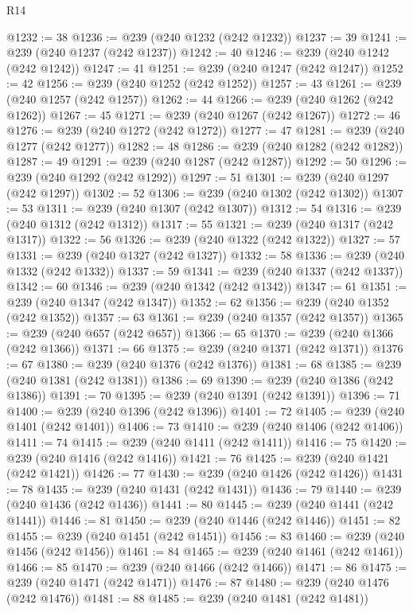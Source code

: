 \begin{lexlean}{R14}
\begin{coremodule}
{{{{{{{{{{{{{{{{{{{{{{{{{{{{{{{{{{{{{{{{{{{{{{{{{{{{{{{{{{{{{{{{{{{{{{{{{{{{{{{{{{{{{{{{{{{{{{{{{{{{{{{{{{@1232 := 38
@1236 := @239 (@240 @1232 (@242 @1232))
@1237 := 39
@1241 := @239 (@240 @1237 (@242 @1237))
@1242 := 40
@1246 := @239 (@240 @1242 (@242 @1242))
@1247 := 41
@1251 := @239 (@240 @1247 (@242 @1247))
@1252 := 42
@1256 := @239 (@240 @1252 (@242 @1252))
@1257 := 43
@1261 := @239 (@240 @1257 (@242 @1257))
@1262 := 44
@1266 := @239 (@240 @1262 (@242 @1262))
@1267 := 45
@1271 := @239 (@240 @1267 (@242 @1267))
@1272 := 46
@1276 := @239 (@240 @1272 (@242 @1272))
@1277 := 47
@1281 := @239 (@240 @1277 (@242 @1277))
@1282 := 48
@1286 := @239 (@240 @1282 (@242 @1282))
@1287 := 49
@1291 := @239 (@240 @1287 (@242 @1287))
@1292 := 50
@1296 := @239 (@240 @1292 (@242 @1292))
@1297 := 51
@1301 := @239 (@240 @1297 (@242 @1297))
@1302 := 52
@1306 := @239 (@240 @1302 (@242 @1302))
@1307 := 53
@1311 := @239 (@240 @1307 (@242 @1307))
@1312 := 54
@1316 := @239 (@240 @1312 (@242 @1312))
@1317 := 55
@1321 := @239 (@240 @1317 (@242 @1317))
@1322 := 56
@1326 := @239 (@240 @1322 (@242 @1322))
@1327 := 57
@1331 := @239 (@240 @1327 (@242 @1327))
@1332 := 58
@1336 := @239 (@240 @1332 (@242 @1332))
@1337 := 59
@1341 := @239 (@240 @1337 (@242 @1337))
@1342 := 60
@1346 := @239 (@240 @1342 (@242 @1342))
@1347 := 61
@1351 := @239 (@240 @1347 (@242 @1347))
@1352 := 62
@1356 := @239 (@240 @1352 (@242 @1352))
@1357 := 63
@1361 := @239 (@240 @1357 (@242 @1357))
@1365 := @239 (@240 @657 (@242 @657))
@1366 := 65
@1370 := @239 (@240 @1366 (@242 @1366))
@1371 := 66
@1375 := @239 (@240 @1371 (@242 @1371))
@1376 := 67
@1380 := @239 (@240 @1376 (@242 @1376))
@1381 := 68
@1385 := @239 (@240 @1381 (@242 @1381))
@1386 := 69
@1390 := @239 (@240 @1386 (@242 @1386))
@1391 := 70
@1395 := @239 (@240 @1391 (@242 @1391))
@1396 := 71
@1400 := @239 (@240 @1396 (@242 @1396))
@1401 := 72
@1405 := @239 (@240 @1401 (@242 @1401))
@1406 := 73
@1410 := @239 (@240 @1406 (@242 @1406))
@1411 := 74
@1415 := @239 (@240 @1411 (@242 @1411))
@1416 := 75
@1420 := @239 (@240 @1416 (@242 @1416))
@1421 := 76
@1425 := @239 (@240 @1421 (@242 @1421))
@1426 := 77
@1430 := @239 (@240 @1426 (@242 @1426))
@1431 := 78
@1435 := @239 (@240 @1431 (@242 @1431))
@1436 := 79
@1440 := @239 (@240 @1436 (@242 @1436))
@1441 := 80
@1445 := @239 (@240 @1441 (@242 @1441))
@1446 := 81
@1450 := @239 (@240 @1446 (@242 @1446))
@1451 := 82
@1455 := @239 (@240 @1451 (@242 @1451))
@1456 := 83
@1460 := @239 (@240 @1456 (@242 @1456))
@1461 := 84
@1465 := @239 (@240 @1461 (@242 @1461))
@1466 := 85
@1470 := @239 (@240 @1466 (@242 @1466))
@1471 := 86
@1475 := @239 (@240 @1471 (@242 @1471))
@1476 := 87
@1480 := @239 (@240 @1476 (@242 @1476))
@1481 := 88
@1485 := @239 (@240 @1481 (@242 @1481))
}}}}}}}}}}}}}}}}}}}}}}}}}}}}}}}}}}}}}}}}}}}}}}}}}}}}}}}}}}}}}}}}}}}}}}}}}}}}}}}}}}}}}}}}}}}}}}}}}}}}}}}}}}
\end{coremodule}
\end{lexlean}
